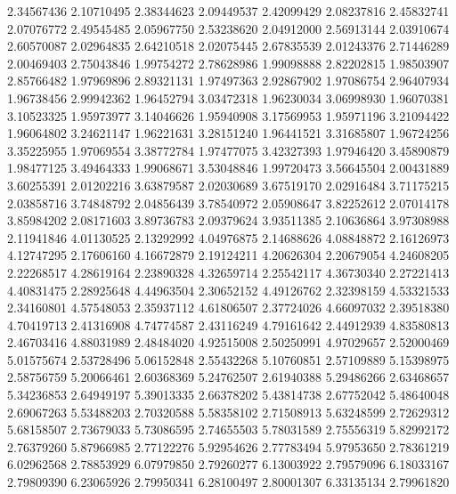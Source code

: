 2.34567436   2.10710495  
2.38344623   2.09449537  
2.42099429   2.08237816  
2.45832741   2.07076772  
2.49545485   2.05967750  
2.53238620   2.04912000  
2.56913144   2.03910674  
2.60570087   2.02964835  
2.64210518   2.02075445  
2.67835539   2.01243376  
2.71446289   2.00469403  
2.75043846   1.99754272  
2.78628986   1.99098888  
2.82202815   1.98503907  
2.85766482   1.97969896  
2.89321131   1.97497363  
2.92867902   1.97086754  
2.96407934   1.96738456  
2.99942362   1.96452794  
3.03472318   1.96230034  
3.06998930   1.96070381  
3.10523325   1.95973977  
3.14046626   1.95940908  
3.17569953   1.95971196  
3.21094422   1.96064802  
3.24621147   1.96221631  
3.28151240   1.96441521  
3.31685807   1.96724256  
3.35225955   1.97069554  
3.38772784   1.97477075  
3.42327393   1.97946420  
3.45890879   1.98477125  
3.49464333   1.99068671  
3.53048846   1.99720473  
3.56645504   2.00431889  
3.60255391   2.01202216  
3.63879587   2.02030689  
3.67519170   2.02916484  
3.71175215   2.03858716  
3.74848792   2.04856439  
3.78540972   2.05908647  
3.82252612   2.07014178  
3.85984202   2.08171603  
3.89736783   2.09379624  
3.93511385   2.10636864  
3.97308988   2.11941846  
4.01130525   2.13292992  
4.04976875   2.14688626  
4.08848872   2.16126973  
4.12747295   2.17606160  
4.16672879   2.19124211  
4.20626304   2.20679054  
4.24608205   2.22268517  
4.28619164   2.23890328  
4.32659714   2.25542117  
4.36730340   2.27221413  
4.40831475   2.28925648  
4.44963504   2.30652152  
4.49126762   2.32398159  
4.53321533   2.34160801  
4.57548053   2.35937112  
4.61806507   2.37724026  
4.66097032   2.39518380  
4.70419713   2.41316908  
4.74774587   2.43116249  
4.79161642   2.44912939  
4.83580813   2.46703416  
4.88031989   2.48484020  
4.92515008   2.50250991  
4.97029657   2.52000469  
5.01575674   2.53728496  
5.06152848   2.55432268  
5.10760851   2.57109889  
5.15398975   2.58756759  
5.20066461   2.60368369  
5.24762507   2.61940388  
5.29486266   2.63468657  
5.34236853   2.64949197  
5.39013335   2.66378202  
5.43814738   2.67752042  
5.48640048   2.69067263  
5.53488203   2.70320588  
5.58358102   2.71508913  
5.63248599   2.72629312  
5.68158507   2.73679033  
5.73086595   2.74655503  
5.78031589   2.75556319  
5.82992172   2.76379260  
5.87966985   2.77122276  
5.92954626   2.77783494  
5.97953650   2.78361219  
6.02962568   2.78853929  
6.07979850   2.79260277  
6.13003922   2.79579096  
6.18033167   2.79809390  
6.23065926   2.79950341  
6.28100497   2.80001307  
6.33135134   2.79961820  
